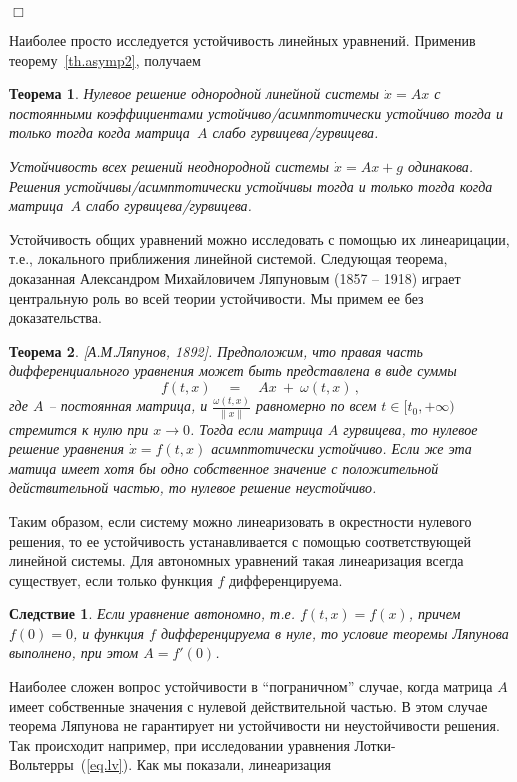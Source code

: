 \documentclass[12pt,a4paper]{article}
\newtheorem{theorem}{Теорема}
\newtheorem{cor}{Следствие}
\begin{document}
   {\hfill $\Box$}
\bigskip

Наиболее просто исследуется  устойчивость линейных уравнений. Применив теорему~\ref{th.asymp2}, получаем
\begin{theorem}\label{th.stab1}
Нулевое решение однородной линейной системы $\dot x = A x $ с постоянными коэффициентами
устойчиво/асимптотически устойчиво тогда и только тогда когда матрица~$A$ слабо гурвицева/гурвицева.

Устойчивость всех решений неоднородной системы $\dot x = Ax + g$ одинакова. Решения устойчивы/асимптотически устойчивы тогда и только тогда когда матрица~$A$ слабо гурвицева/гурвицева.
\end{theorem}

Устойчивость общих уравнений можно исследовать с помощью их линеарицации, т.е., локального
приближения линейной системой. Следующая теорема, доказанная Александром Михайловичем Ляпуновым (1857 -- 1918) играет центральную роль во всей теории устойчивости.
Мы примем ее без доказательства.
\begin{theorem}\label{th.stab2}[А.М.Ляпунов, 1892]. Предположим, что
правая часть дифференциального уравнения может быть представлена в виде суммы
$$
f(t, x) \quad  = \quad  Ax \ + \ \omega(t, x)\, ,
$$
где $A$ -- постоянная матрица,
 и  $\frac{\omega (t, x)}{\|x\|}$ равномерно по всем $t \in [t_0, + \infty)$ стремится к нулю при $x \to 0$.
 Тогда если матрица $A$ гурвицева, то нулевое решение уравнения $\dot x = f(t, x)$ асимптотически устойчиво.
 Если же эта матица имеет хотя бы одно собственное значение с положительной действительной частью,
 то нулевое  решение неустойчиво.
\end{theorem}
Таким образом, если систему можно линеаризовать в окрестности нулевого решения, то
ее устойчивость устанавливается с помощью соответствующей линейной системы.
Для автономных уравнений такая линеаризация всегда существует, если только функция $f$
дифференцируема.
\begin{cor}\label{c.stab2}
Если уравнение автономно, т.е. $f(t, x) = f(x)$, причем $f(0) = 0$, и функция $f$ дифференцируема в нуле, то условие
теоремы Ляпунова выполнено, при этом $A = f'(0)$.
\end{cor}
Наиболее сложен вопрос устойчивости в ``пограничном'' случае, когда матрица $A$ имеет собственные значения
с нулевой действительной частью. В этом случае теорема Ляпунова не гарантирует ни устойчивости ни неустойчивости решения.
Так происходит например, при исследовании уравнения Лотки-Вольтерры~(\ref{eq.lv}). Как мы показали, линеаризация
\end{document}
